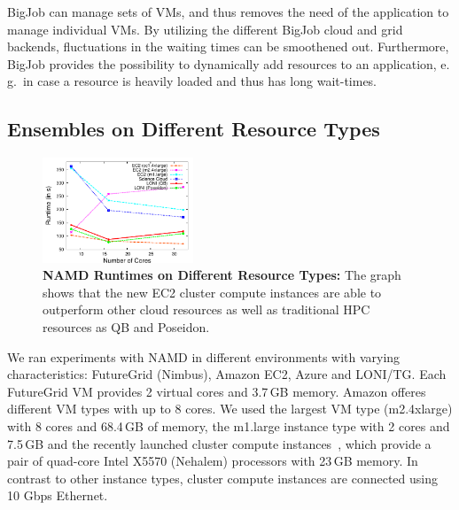 \documentclass[conference,final]{IEEEtran}
\newcommand{\up}{\vspace*{-1em}}
\begin{document}
BigJob can manage sets of VMs, and thus removes the need of the
application to manage individual VMs. By utilizing the different
BigJob cloud and grid backends, fluctuations in the waiting times can
be smoothened out. Furthermore, BigJob provides the possibility to
dynamically add resources to an application, e.\,g.\ in case a
resource is heavily loaded and thus has long wait-times.



\subsection{Ensembles on Different Resource Types}
\up
\label{sec:performance_namd}

\begin{figure}[t]
    \centering
        \includegraphics[width=0.4\textwidth]{performance/namd_run}
    \caption{\textbf{NAMD Runtimes on Different Resource Types: } The
          graph shows that the new EC2 cluster compute instances are 
          able to outperform other cloud resources as well as traditional
          HPC resources as QB and Poseidon.\up}
    \label{fig:performance_namd_run}

\end{figure}


We ran experiments with NAMD in different environments with varying
characteristics: FutureGrid (Nimbus), Amazon EC2, Azure and
LONI/TG.  Each FutureGrid VM provides 2 virtual cores and
3.7\,GB memory.  Amazon offeres different VM types with up to 8
cores. We used the largest VM type (m2.4xlarge) with 8 cores and
68.4\,GB of memory, the m1.large instance type with 2 cores and
7.5\,GB and the recently launched cluster compute
instances~\cite{ec2-cc}, which provide a pair of quad-core Intel X5570
(Nehalem) processors with 23\,GB memory. In contrast to other instance
types, cluster compute instances are connected using 10 Gbps Ethernet.
\end{document}
